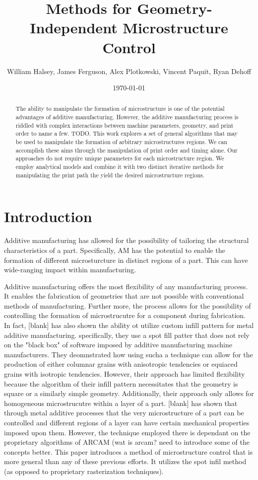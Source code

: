 \documentclass[a4paper]{article}
\title{Methods for Geometry-Independent Microstructure Control}
\author{William Halsey, James Ferguson, Alex Plotkowski, Vincent Paquit, Ryan Dehoff}
\date{\today}
\begin{document}
\maketitle

\begin{abstract}
The ability to manipulate the formation of microstructure is one of the potential advantages of additive manufacturing. However, the additive manufacturing process is riddled with complex interactions between machine parameters, geometry, and print order to name a few. TODO. This work explores a set of general algorithms that may be used to manipulate the formation of arbitrary microstructures regions. We can accomplish these aims through the manipulation of print order and timing alone. Our approaches do not require unique parameters for each microstructure region. We employ analytical models and combine it with two distinct iterative methods for manipulating the print path the yield the desired microstructure regions. 
\end{abstract}


\section{Introduction}
\label{sec:intro}

Additive manufacturing has allowed for the possibility of tailoring the structural characteristics of a part. Specifically, AM has the potential to enable the formation of different microsturcture in distinct regions of a part. This can have wide-ranging impact within manufacturing.

Additive manufacturing offers the most flexibility of any manufacturing process. It enables the fabrication of geometries that are not possible with conventional methods of manufacturing. Further more, the process allows for the possibility of controlling the formation of microstrucutre for a component during fabrication. In fact, [blank] has also shown the ability ot utilize custom infill pattern for metal additive manufacturing. specifically, they use a spot fill patter that does not rely on the "black box" of software imposed by additive manufacturing machine manufacturers. They deomnstrated how using sucha a technique can allow for the production of either columnar grains with anisotropic tendencies or equiaced grains with isotropic tendencies. However, their approach has limited flexibility because the algorithm of their infill pattern necessitates that the geometry is square or a similarly simple geometry. Additionally, their approach only allows for homogeneous microstrucutre within a layer of a part. [blank] has shown that through metal additive processes that the very microstructure of a part can be controlled and different regions of a layer can have certain mechanical properties imposed upon them. However, the technique employed there is dependant on the proprietary algorithms of ARCAM (wat is arcam? need to introduce some of the concepts better. This paper introduces a method of microstructure control that is more general than any of these previous efforts. It utilizes the spot infil method (as opposed to proprietary rasterization techniques).
\end{document}
